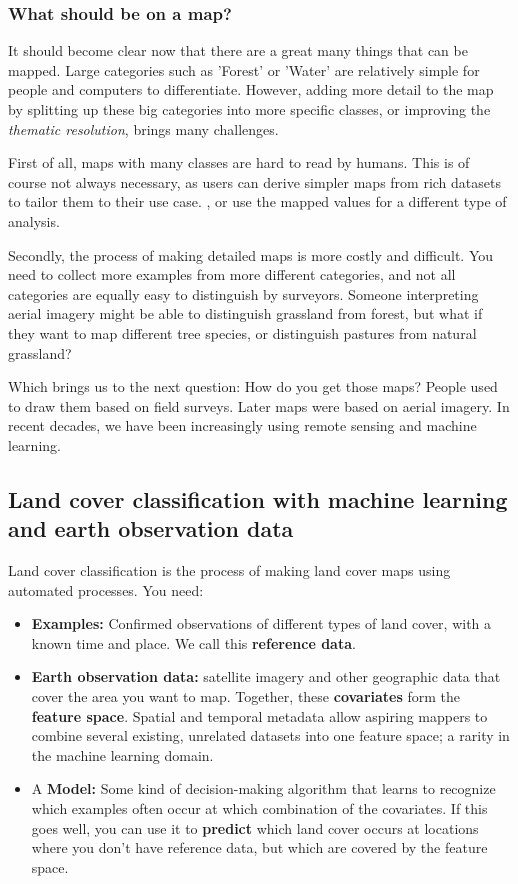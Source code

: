     \subsubsection*{What should be on a map?}

        It should become clear now that there are a great many things that can be mapped. Large categories such as 'Forest' or 'Water' are relatively simple for people and computers to differentiate. However, adding more detail to the map by splitting up these big categories into more specific classes, or improving the \textit{thematic resolution}, brings many challenges. 
        
        First of all, maps with many classes are hard to read by humans. This is of course not always necessary, as users can derive simpler maps from rich datasets to tailor them to their use case. \citep{tsendbazar2017integrating}, or use the mapped values for a different type of analysis. 

        Secondly, the process of making detailed maps is more costly and difficult. You need to collect more examples from more different categories, and not all categories are equally easy to distinguish by surveyors. Someone interpreting aerial imagery might be able to distinguish grassland from forest, but what if they want to map different tree species, or distinguish pastures from natural grassland?

    Which brings us to the next question: How do you get those maps? People used to draw them based on field surveys. Later maps were based on aerial imagery. In recent decades, we have been increasingly using remote sensing and machine learning.

\subsection*{Land cover classification with machine learning and earth observation data}
    
    Land cover classification is the process of making land cover maps using automated processes. You need:
    
    \begin{itemize}
        \item \textbf{Examples:} Confirmed observations of different types of land cover, with a known time and place. We call this \textbf{reference data}.
        \item \textbf{Earth observation data:} satellite imagery and other geographic data that cover the area you want to map. Together, these \textbf{covariates} form the \textbf{feature space}. Spatial and temporal metadata allow aspiring mappers to combine several existing, unrelated datasets into one feature space; a rarity in the machine learning domain. 
        \item A \textbf{Model:} Some kind of decision-making algorithm that learns to recognize which examples often occur at which combination of the covariates. If this goes well, you can use it to \textbf{predict} which land cover occurs at locations where you don't have reference data, but which are covered by the feature space.
    \end{itemize}
    
